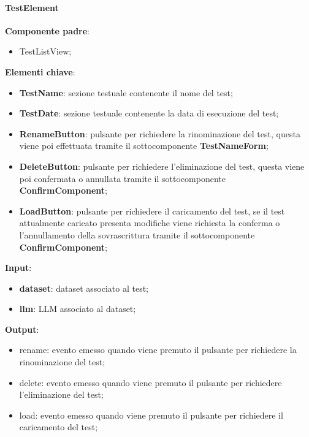 \paragraph{TestElement}
\textbf{Componente padre}:
\begin{itemize}
    \item TestListView;
\end{itemize}
\textbf{Elementi chiave}:
\begin{itemize}
    \item \textbf{TestName}: sezione testuale contenente il nome del test;
    \item \textbf{TestDate}: sezione testuale contenente la data di esecuzione del test;
    \item \textbf{RenameButton}: pulsante per richiedere la rinominazione del test, questa viene poi effettuata tramite il sottocomponente \textbf{TestNameForm};
    \item \textbf{DeleteButton}: pulsante per richiedere l'eliminazione del test, questa viene poi confermata o annullata tramite il sottocomponente \textbf{ConfirmComponent};
    \item \textbf{LoadButton}: pulsante per richiedere il caricamento del test, se il test attualmente caricato presenta modifiche viene richiesta la conferma o l'annullamento della sovrascrittura tramite il sottocomponente \textbf{ConfirmComponent};
\end{itemize}
\textbf{Input}:
\begin{itemize}
    \item \textbf{dataset}: dataset associato al test;
    \item \textbf{llm}: LLM associato al dataset;
\end{itemize}
\textbf{Output}:
\begin{itemize}
    \item rename: evento emesso quando viene premuto il pulsante per richiedere la rinominazione del test;
    \item delete: evento emesso quando viene premuto il pulsante per richiedere l'eliminazione del test;
    \item load: evento emesso quando viene premuto il pulsante per richiedere il caricamento del test;
\end{itemize}
